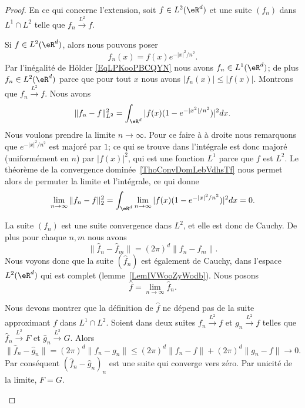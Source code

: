 \begin{proof}
	En ce qui concerne l'extension, soit \( f\in L^2(\eR^d)\) et une suite \( (f_n)\) dans \( L^1\cap L^2\) telle que \( f_n\stackrel{L^2}{\longrightarrow}f\).
	\begin{subproof}
		Si \( f\in L^2(\eR^d)\), alors nous pouvons poser
		\begin{equation}    \label{EQooHGJYooJsmxoX}
			f_n(x)=f(x) e^{-|x|^2/n^2}.
		\end{equation}
		Par l'inégalité de Hölder \eqref{EqLPKooPBCQYN} nous avons \( f_n\in L^1(\eR^d)\); de plus \( f_n\in L^2(\eR^d)\) parce que pour tout \( x\) nous avons \( | f_n(x) |\leq | f(x) |\). Montrons que \( f_n\stackrel{L^2}{\longrightarrow}f\). Nous avons
		\begin{equation}
			\| f_n-f \|_{L^2}^2=\int_{\eR^d}| f(x)(1- e^{-| x^2 |/n^2}) |^2dx.
		\end{equation}
		Nous voulons prendre la limite \( n\to \infty\). Pour ce faire à à droite nous remarquons que \(  e^{-| x |^2/n^2}\) est majoré par \( 1\); ce qui se trouve dans l'intégrale est donc majoré (uniformément en \( n\)) par \( | f(x) |^2\), qui est une fonction \( L^1\) parce que \( f\) est \( L^2\). Le théorème de la convergence dominée~\ref{ThoConvDomLebVdhsTf} nous permet alors de permuter la limite et l'intégrale, ce qui donne
		\begin{equation}
			\lim_{n\to \infty} \| f_n-f \|_2^2=\int_{\eR^d}\lim_{n\to \infty} | f(x)(1- e^{-| x |^2/n^2}) |^2dx=0.
		\end{equation}


		La suite \( (f_n)\) est une suite convergence dans \( L^2\), et elle est donc de Cauchy. De plus pour chaque \( n,m\) nous avons
		\begin{equation}
			\| \hat f_n-\hat f_m \|=(2\pi)^d\| f_n-f_m \|.
		\end{equation}
		Nous voyons donc que la suite \( (\hat f_n)\) est également de Cauchy, dans l'espace \( L^2(\eR^d)\) qui est complet (lemme~\ref{LemIVWooZyWodb}). Nous posons
		\begin{equation}
			\hat f=\lim_{n\to \infty} \hat f_n.
		\end{equation}

		Nous devons montrer que la définition de \( \hat f\) ne dépend pas de la suite approximant \( f\) dans \( L^1\cap L^2\). Soient dans deux suites \( f_n\stackrel{L^2}{\longrightarrow}f\) et \( g_n\stackrel{L^2}{\longrightarrow}f\) telles que \( \hat f_n\stackrel{L^2}{\longrightarrow}F\) et \( \hat g_n\stackrel{L^2}{\longrightarrow}G\). Alors
		\begin{equation}
			\| \hat f_n-\hat g_n \|=(2\pi)^d\| f_n-g_n \|\leq (2\pi)^d\| f_n-f \|+(2\pi)^d\| g_n-f \|\to 0.
		\end{equation}
		Par conséquent \( (\hat f_n-\hat g_n)_n\) est une suite qui converge vers zéro. Par unicité de la limite, \( F=G\).
	\end{subproof}
\end{proof}

